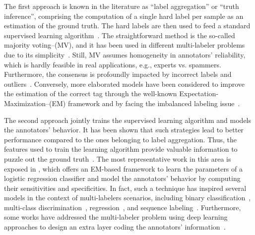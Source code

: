 \documentclass[journal]{IEEEtran}
\begin{document}
The first approach is known in the literature as ``label aggregation''
or ``truth inference'', comprising the computation of a single hard
label per sample as an estimation of the ground truth. The
hard labels are then used to feed a standard supervised learning
algorithm~\cite{morales2019scalable}. The straightforward method is the so-called majority voting--(MV), and it has been used in
different multi-labeler problems due to its
simplicity~\cite{zhang2014imbalanced}. Still, MV assumes homogeneity
in annotators' reliability, which is hardly feasible in real
applications, e.g., experts vs. spammers. Furthermore, the consensus
is profoundly impacted by incorrect labels and
outliers~\cite{kara2015modeling}. Conversely, more elaborated models
have been considered to improve the estimation of the correct tag through the well-known Expectation-Maximization--(EM) framework and by facing the imbalanced labeling issue~\cite{dawid1979maximum,zhang2014imbalanced}.

The second approach jointly trains the supervised learning algorithm and models the annotators' behavior. It has been shown that such strategies lead to better performance compared to the ones belonging to label
aggregation. Thus, the features used to train the learning algorithm
provide valuable information to puzzle out the ground
truth~\cite{ruiz2019learning}. The most representative work in this area is exposed in \cite{raykar2010learning}, which offers an EM-based framework to learn the parameters of a logistic regression classifier and model the annotators' behavior by computing their sensitivities and specificities. In fact, such a technique has inspired several models
in the context of multi-labelers scenarios, including binary
classification~\cite{rodrigues2014gaussian,ruiz2019learning},
multi-class discrimination~\cite{morales2019scalable,gonzalez2015automatic}, regression~\cite{groot2011learning,rodrigues2017learning}, and sequence
labeling~\cite{rodrigues2014sequence}. Furthermore, some works have addressed the multi-labeler problem using deep learning approaches to design an extra layer coding the
annotators' information~\cite{albarqouni2016aggnet,rodrigues2018deep,guan2018said}. 
\end{document}
